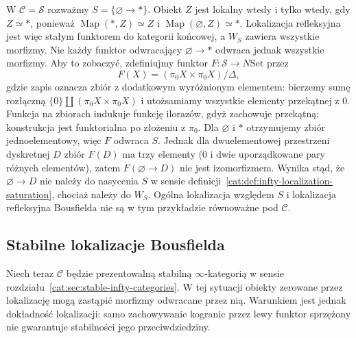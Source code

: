 \begin{przyklad}\label{cat:ex:infty-bousfield-not-ordinary}
W $\mathcal C=\mathcal S$ rozważmy $S=\{\varnothing\to *\}$. Obiekt $Z$ jest lokalny wtedy i tylko wtedy, gdy $Z\simeq *$, ponieważ $\operatorname{Map}(*,Z)\simeq Z$ i $\operatorname{Map}(\varnothing,Z)\simeq *$. Lokalizacja refleksyjna jest więc stałym funktorem do kategorii końcowej, a $W_S$ zawiera wszystkie morfizmy. Nie każdy funktor odwracający $\varnothing\to *$ odwraca jednak wszystkie morfizmy. Aby to zobaczyć, zdefiniujmy funktor $F:\mathcal S\to N\mathrm{Set}$ przez
\[
 F(X)=(\pi_0X\times\pi_0X)/\Delta,
\]
gdzie zapis oznacza zbiór z dodatkowym wyróżnionym elementem: bierzemy sumę rozłączną $\{0\}\amalg(\pi_0X\times\pi_0X)$ i utożsamiamy wszystkie elementy przekątnej z $0$. Funkcja na zbiorach indukuje funkcję ilorazów, gdyż zachowuje przekątną; konstrukcja jest funktorialna po złożeniu z $\pi_0$. Dla $\varnothing$ i $*$ otrzymujemy zbiór jednoelementowy, więc $F$ odwraca $S$. Jednak dla dwuelementowej przestrzeni dyskretnej $D$ zbiór $F(D)$ ma trzy elementy ($0$ i dwie uporządkowane pary różnych elementów), zatem $F(\varnothing\to D)$ nie jest izomorfizmem. Wynika stąd, że $\varnothing\to D$ nie należy do nasycenia $S$ w sensie definicji~\ref{cat:def:infty-localization-saturation}, chociaż należy do $W_S$. Ogólna lokalizacja względem $S$ i lokalizacja refleksyjna Bousfielda nie są w tym przykładzie równoważne pod $\mathcal C$.
\end{przyklad}

\subsection{Stabilne lokalizacje Bousfielda}

Niech teraz $\mathcal C$ będzie prezentowalną stabilną $\infty$-kategorią w sensie rozdziału~\ref{cat:sec:stable-infty-categories}. W tej sytuacji obiekty zerowane przez lokalizację mogą zastąpić morfizmy odwracane przez nią. Warunkiem jest jednak dokładność lokalizacji: samo zachowywanie kogranic przez lewy funktor sprzężony nie gwarantuje stabilności jego przeciwdziedziny.

